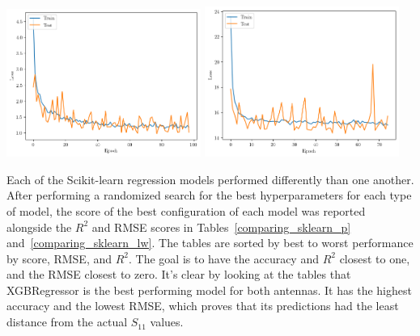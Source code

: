 \documentclass[conference]{IEEEtran}
\newenvironment{Figure}
    {\par\medskip\noindent\minipage{\linewidth}}
    {\endminipage\par\medskip}
\begin{document}
\begin{Figure}
    \centering
    \includegraphics[width=2.5in]{loss}
    \includegraphics[width=2.5in]{loss_lw}
    \label{dnn_loss_graph}
\end{Figure}

Each of the Scikit-learn regression models performed differently than one another. After performing a randomized search for the best hyperparameters for each type of model, the score of the best configuration of each model was reported alongside the $R^2$ and RMSE scores in Tables~\ref{comparing_sklearn_p} and~\ref{comparing_sklearn_lw}. The tables are sorted by best to worst performance by score, RMSE, and $R^2$. The goal is to have the accuracy and $R^2$ closest to one, and the RMSE closest to zero. It's clear by looking at the tables that XGBRegressor is the best performing model for both antennas. It has the highest accuracy and the lowest RMSE, which proves that its predictions had the least distance from the actual $S_{11}$ values. 
    
\end{document}
